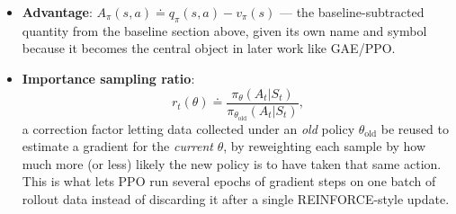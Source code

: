 \documentclass[11pt]{article}
\begin{document}
\begin{itemize}
  \item \textbf{Advantage}: $A_\pi(s,a) \doteq q_\pi(s,a) - v_\pi(s)$ --- the
  baseline-subtracted quantity from the baseline section above, given its own name and
  symbol because it becomes the central object in later work like GAE/PPO.
  \item \textbf{Importance sampling ratio}:
  $$r_t(\theta) \doteq \frac{\pi_\theta(A_t|S_t)}{\pi_{\theta_{\text{old}}}(A_t|S_t)},$$
  a correction factor letting data collected under an \emph{old} policy $\theta_{\text{old}}$
  be reused to estimate a gradient for the \emph{current} $\theta$, by reweighting each
  sample by how much more (or less) likely the new policy is to have taken that same
  action. This is what lets PPO run several epochs of gradient steps on one batch of
  rollout data instead of discarding it after a single REINFORCE-style update.
\end{itemize}
\end{document}
